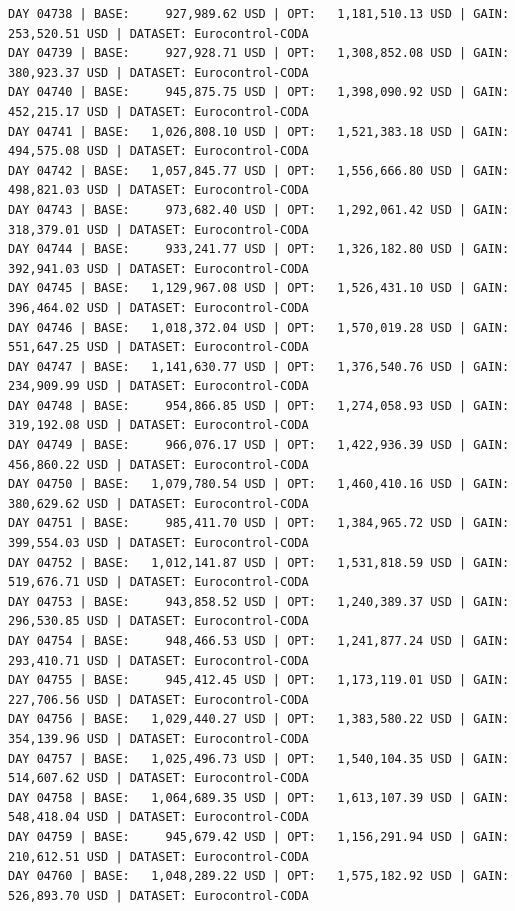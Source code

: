 \documentclass[11pt,a4paper]{article}
\begin{document}
\begin{verbatim}
DAY 04738 | BASE:     927,989.62 USD | OPT:   1,181,510.13 USD | GAIN: 253,520.51 USD | DATASET: Eurocontrol-CODA
DAY 04739 | BASE:     927,928.71 USD | OPT:   1,308,852.08 USD | GAIN: 380,923.37 USD | DATASET: Eurocontrol-CODA
DAY 04740 | BASE:     945,875.75 USD | OPT:   1,398,090.92 USD | GAIN: 452,215.17 USD | DATASET: Eurocontrol-CODA
DAY 04741 | BASE:   1,026,808.10 USD | OPT:   1,521,383.18 USD | GAIN: 494,575.08 USD | DATASET: Eurocontrol-CODA
DAY 04742 | BASE:   1,057,845.77 USD | OPT:   1,556,666.80 USD | GAIN: 498,821.03 USD | DATASET: Eurocontrol-CODA
DAY 04743 | BASE:     973,682.40 USD | OPT:   1,292,061.42 USD | GAIN: 318,379.01 USD | DATASET: Eurocontrol-CODA
DAY 04744 | BASE:     933,241.77 USD | OPT:   1,326,182.80 USD | GAIN: 392,941.03 USD | DATASET: Eurocontrol-CODA
DAY 04745 | BASE:   1,129,967.08 USD | OPT:   1,526,431.10 USD | GAIN: 396,464.02 USD | DATASET: Eurocontrol-CODA
DAY 04746 | BASE:   1,018,372.04 USD | OPT:   1,570,019.28 USD | GAIN: 551,647.25 USD | DATASET: Eurocontrol-CODA
DAY 04747 | BASE:   1,141,630.77 USD | OPT:   1,376,540.76 USD | GAIN: 234,909.99 USD | DATASET: Eurocontrol-CODA
DAY 04748 | BASE:     954,866.85 USD | OPT:   1,274,058.93 USD | GAIN: 319,192.08 USD | DATASET: Eurocontrol-CODA
DAY 04749 | BASE:     966,076.17 USD | OPT:   1,422,936.39 USD | GAIN: 456,860.22 USD | DATASET: Eurocontrol-CODA
DAY 04750 | BASE:   1,079,780.54 USD | OPT:   1,460,410.16 USD | GAIN: 380,629.62 USD | DATASET: Eurocontrol-CODA
DAY 04751 | BASE:     985,411.70 USD | OPT:   1,384,965.72 USD | GAIN: 399,554.03 USD | DATASET: Eurocontrol-CODA
DAY 04752 | BASE:   1,012,141.87 USD | OPT:   1,531,818.59 USD | GAIN: 519,676.71 USD | DATASET: Eurocontrol-CODA
DAY 04753 | BASE:     943,858.52 USD | OPT:   1,240,389.37 USD | GAIN: 296,530.85 USD | DATASET: Eurocontrol-CODA
DAY 04754 | BASE:     948,466.53 USD | OPT:   1,241,877.24 USD | GAIN: 293,410.71 USD | DATASET: Eurocontrol-CODA
DAY 04755 | BASE:     945,412.45 USD | OPT:   1,173,119.01 USD | GAIN: 227,706.56 USD | DATASET: Eurocontrol-CODA
DAY 04756 | BASE:   1,029,440.27 USD | OPT:   1,383,580.22 USD | GAIN: 354,139.96 USD | DATASET: Eurocontrol-CODA
DAY 04757 | BASE:   1,025,496.73 USD | OPT:   1,540,104.35 USD | GAIN: 514,607.62 USD | DATASET: Eurocontrol-CODA
DAY 04758 | BASE:   1,064,689.35 USD | OPT:   1,613,107.39 USD | GAIN: 548,418.04 USD | DATASET: Eurocontrol-CODA
DAY 04759 | BASE:     945,679.42 USD | OPT:   1,156,291.94 USD | GAIN: 210,612.51 USD | DATASET: Eurocontrol-CODA
DAY 04760 | BASE:   1,048,289.22 USD | OPT:   1,575,182.92 USD | GAIN: 526,893.70 USD | DATASET: Eurocontrol-CODA

\end{verbatim}
\end{document}
